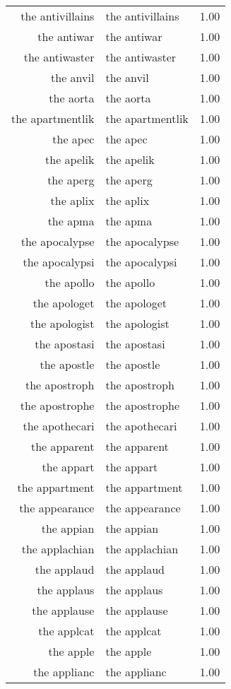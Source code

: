 \begin{table}[ht]
\begin{tabular}{rlr}
  the antivillains & the antivillains & 1.00 \\ 
  the antiwar & the antiwar & 1.00 \\ 
  the antiwaster & the antiwaster & 1.00 \\ 
  the anvil & the anvil & 1.00 \\ 
  the aorta & the aorta & 1.00 \\ 
  the apartmentlik & the apartmentlik & 1.00 \\ 
  the apec & the apec & 1.00 \\ 
  the apelik & the apelik & 1.00 \\ 
  the aperg & the aperg & 1.00 \\ 
  the aplix & the aplix & 1.00 \\ 
  the apma & the apma & 1.00 \\ 
  the apocalypse & the apocalypse & 1.00 \\ 
  the apocalypsi & the apocalypsi & 1.00 \\ 
  the apollo & the apollo & 1.00 \\ 
  the apologet & the apologet & 1.00 \\ 
  the apologist & the apologist & 1.00 \\ 
  the apostasi & the apostasi & 1.00 \\ 
  the apostle & the apostle & 1.00 \\ 
  the apostroph & the apostroph & 1.00 \\ 
  the apostrophe & the apostrophe & 1.00 \\ 
  the apothecari & the apothecari & 1.00 \\ 
  the apparent & the apparent & 1.00 \\ 
  the appart & the appart & 1.00 \\ 
  the appartment & the appartment & 1.00 \\ 
  the appearance & the appearance & 1.00 \\ 
  the appian & the appian & 1.00 \\ 
  the applachian & the applachian & 1.00 \\ 
  the applaud & the applaud & 1.00 \\ 
  the applaus & the applaus & 1.00 \\ 
  the applause & the applause & 1.00 \\ 
  the applcat & the applcat & 1.00 \\ 
  the apple & the apple & 1.00 \\ 
  the applianc & the applianc & 1.00 \\ 

\end{tabular}
\end{table}
